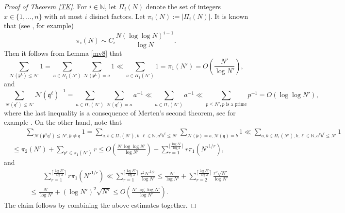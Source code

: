 \documentclass[11pt]{amsart}
\theoremstyle{definition}
\newcommand{\N}{{\mathbb N}}
\newcommand{\NN}{{\mathcal N}}
\newcommand{\mf}{\mathfrak}
\newcommand{\WS}[1]{{\color{blue}{{#1}}}}
\begin{document}
\begin{proof}[Proof of Theorem \ref{TK}]
For $i\in\N$, let  $\Pi_{i}(N)$ denote the set of integers  $x\in\{1,\dots,n\}$ with at most $i$ disinct factors. Let $\pi_{i}(N):=\vert\Pi_{i}(N)\vert$. It is known that (see \cite[Chapter II.6]{tenebaum_2015}, for example)
$$\pi_{i}(N)\sim C_{i}\frac{N(\log\log N)^{i-1}}{\log N}.$$
Then it follows from  Lemma \ref{mv8}  that 
$$\sum_{\NN(\mf p^{k})\leq N'} 1=\sum_{a\in \Pi_{1}(N')}\sum_{\NN(\mf p^{k})=a} 1\ll \sum_{a\in \Pi_{1}(N')} 1=\pi_{1}(N')=O(\frac{N'}{\log N'}),$$
and
$$\sum_{\NN(\mf q^{\ell})\leq N'} \NN(\mf q^{\ell})^{-1}=\sum_{a\in \Pi_{1}(N')}\sum_{\NN(\mf q^{\ell})=a} a^{-1}\ll \sum_{a\in \Pi_{1}(N')} a^{-1}\ll \sum_{p\leq N', p \text{ is a prime}} p^{-1}=O(\log\log N'),$$
where the last inequality is a consequence of Merten's second theorem, see for example \cite[Chapter I.1, Theorem~9]{tenebaum_2015}. 
On the other hand, note that
\begin{equation}\nonumber
    \begin{split}
      &\qquad \sum_{\NN(\mf p^{k}\mf q^{\ell})\leq N', \mf p\neq \mf q} 1=\sum_{a,b\in \Pi_{1}(N'),k,\ell\in\N,a^{k}b^{\ell}\leq N'}\sum_{\NN(\mf p)=a, \NN(\mf q)=b}1
       \ll \sum_{a,b\in \Pi_{1}(N'),k,\ell\in\N,a^{k}b^{\ell}\leq N'} 1
       \\&\leq \pi_{2}(N')+\sum_{p^{r}\in \pi_{1}(N')} r
       \leq O(\frac{N'\log\log N'}{\log N'})+\sum_{r=1}^{\lceil\frac{\log N'}{\log 2}\rceil}r\pi_{1}({N'}^{1/r}),
    \end{split}
\end{equation}
and 
\begin{equation}\nonumber
    \begin{split}
      &\qquad \sum_{r=1}^{\lceil\frac{\log N'}{\log 2}\rceil}r\pi_{1}({N'}^{1/r})
      \ll \sum_{r=1}^{\lceil\frac{\log N'}{\log 2}\rceil}\frac{r^{2}{N'}^{1/r}}{\log N'}
      \leq \frac{N'}{\log N'}+\sum_{r=2}^{\lceil\frac{\log N'}{\log 2}\rceil}\frac{r^{2}\sqrt{N'}}{\log N'}
      \\&\leq \frac{N'}{\log N'}+(\log N')^{2}\sqrt{N'}
      \leq O(\frac{N'\log\log N'}{\log N'}). 
    \end{split}
\end{equation}
The claim follows by combining the above estimates together.
 











\end{proof}
\end{document}
